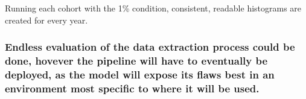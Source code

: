\documentclass[]{article}
\begin{document}
Running each cohort with the 1\% condition, consistent, readable
histograms are created for every year.

\subsubsection{Endless evaluation of the data extraction process could
be done, hovever the pipeline will have to eventually be deployed, as
the model will expose its flaws best in an environment most specific to
where it will be
used.}\label{endless-evaluation-of-the-data-extraction-process-could-be-done-hovever-the-pipeline-will-have-to-eventually-be-deployed-as-the-model-will-expose-its-flaws-best-in-an-environment-most-specific-to-where-it-will-be-used.}
\end{document}
